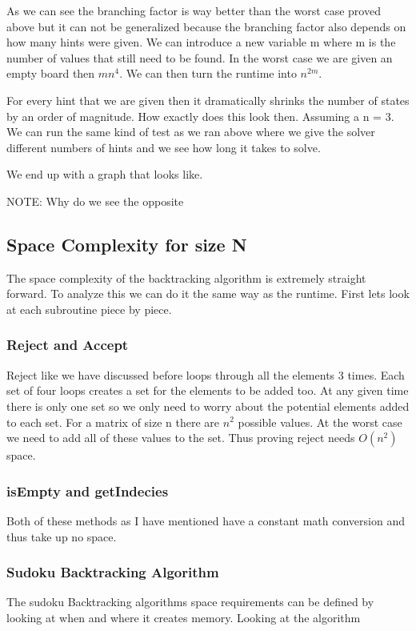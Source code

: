 \documentclass{sig-alternate}
\begin{document}
As we can see the branching factor is way better than the worst case proved above but it can not be generalized because the branching factor also depends on how many hints were given. We can introduce a new variable m where m is the number of values that still need to be found. In the worst case we are given an empty board then $ m  n^4$. We can then turn the runtime into $n^{2m}$. 

For every hint that we are given then it dramatically shrinks the number of states by an order of magnitude. How exactly does this look then. Assuming a n = 3. We can run the same kind of test as we ran above where we give the solver different numbers of hints and we see how long it takes to solve. 

We end up with a graph that looks like. 


NOTE: Why do we see the opposite

\subsection{Space Complexity for size N}
The space complexity of the backtracking algorithm is extremely straight forward. To analyze this we can do it the same way as the runtime. First lets look at each subroutine piece by piece. 

\subsubsection{Reject and Accept}
Reject like we have discussed before loops through all the elements 3 times. Each set of four loops creates a set for the elements to be added too. At any given time there is only one set so we only need to worry about the potential elements added to each set. For a matrix of size n there are $n^2$ possible values. At the worst case we need to add all of these values to the set. Thus proving reject needs $O(n^2)$ space. 

\subsubsection{isEmpty and getIndecies}
Both of these methods as I have mentioned have a constant math conversion and thus take up no space. 

\subsubsection{Sudoku Backtracking Algorithm}
The sudoku Backtracking algorithms space requirements can be defined by looking at when and where it creates memory. Looking at the algorithm 
\end{document}
